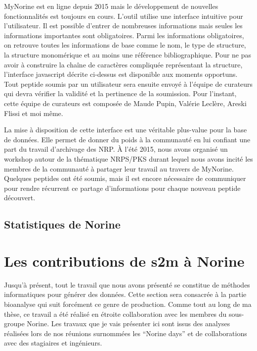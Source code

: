 MyNorine est en ligne depuis 2015 mais le développement de nouvelles fonctionnalités est toujours en cours.
L'outil utilise une interface intuitive pour l'utilisateur.
Il est possible d'entrer de nombreuses informations mais seules les informations importantes sont obligatoires.
Parmi les informations obligatoires, on retrouve toutes les informations de base comme le nom, le type de structure, la structure monomérique et au moins une référence bibliographique.
Pour ne pas avoir à construire la chaîne de caractères compliquée représentant la structure, l'interface javascript décrite ci-dessus est disponible aux moments opportuns.
Tout peptide soumis par un utilisateur sera ensuite envoyé à l'équipe de curateurs qui devra vérifier la validité et la pertinence de la soumission.
Pour l'instant, cette équipe de curateurs est composée de Maude Pupin, Valérie Leclère, Areski Flissi et moi même.

La mise à disposition de cette interface est une véritable plus-value pour la base de données.
Elle permet de donner du poids à la communauté en lui confiant une part du travail d'archivage des NRP.
À l'été 2015, nous avons organisé un workshop autour de la thématique NRPS/PKS durant lequel nous avons incité les membres de la communauté à partager leur travail au travers de MyNorine.
Quelques peptides ont été soumis, mais il est encore nécessaire de communiquer pour rendre récurrent ce partage d'informations pour chaque nouveau peptide découvert.


\subsection{Statistiques de Norine}








\section{Les contributions de s2m à Norine}

Jusqu'à présent, tout le travail que nous avons présenté se constitue de méthodes informatiques pour générer des données.
Cette section sera consacrée à la partie bioanalyse qui suit forcément ce genre de production.
Comme tout au long de ma thèse, ce travail a été réalisé en étroite collaboration avec les membres du sous-groupe Norine.
Les travaux que je vais présenter ici sont issus des analyses réalisées lors de nos réunions surnommées les ``Norine days'' et de collaborations avec des stagiaires et ingénieurs.

